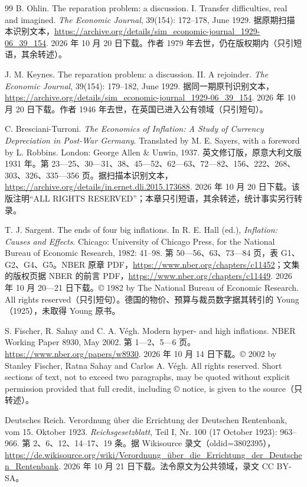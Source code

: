 \begin{thebibliography}{99}
 B. Ohlin. The reparation problem: a discussion. I. Transfer difficulties, real and imagined. \emph{The Economic Journal}, 39(154): 172--178, June 1929. 据原期扫描本识别文本，\url{https://archive.org/details/sim_economic-journal_1929-06_39_154}. 2026 年 10 月 20 日下载。作者 1979 年去世，仍在版权期内（只引短语，其余转述）。

 J. M. Keynes. The reparation problem: a discussion. II. A rejoinder. \emph{The Economic Journal}, 39(154): 179--182, June 1929. 据同一期原刊识别文本，\url{https://archive.org/details/sim_economic-journal_1929-06_39_154}. 2026 年 10 月 20 日下载。作者 1946 年去世，在英国已进入公有领域（只引短句）。

 C. Bresciani-Turroni. \emph{The Economics of Inflation: A Study of Currency Depreciation in Post-War Germany}. Translated by M. E. Sayers, with a foreword by L. Robbins. London: George Allen \& Unwin, 1937. 英文修订版，原意大利文版 1931 年。第 23—25、30—31、38、45—52、62—63、72—82、156、222、268、303、326、335—356 页。据扫描本识别文本，\url{https://archive.org/details/in.ernet.dli.2015.173688}. 2026 年 10 月 20 日下载。该版注明“ALL RIGHTS RESERVED”；本章只引短语，其余转述，统计事实另行转录。

 T. J. Sargent. The ends of four big inflations. In R. E. Hall (ed.), \emph{Inflation: Causes and Effects}. Chicago: University of Chicago Press, for the National Bureau of Economic Research, 1982: 41--98. 第 50—56、63、73—84 页，表 G1、G2、G4、G5。NBER 原章 PDF，\url{https://www.nber.org/chapters/c11452}；文集的版权页据 NBER 的前言 PDF，\url{https://www.nber.org/chapters/c11449}. 2026 年 10 月 20—21 日下载。© 1982 by The National Bureau of Economic Research. All rights reserved（只引短句）。德国的物价、预算与裁员数字据其转引的 Young（1925），未取得 Young 原书。

 S. Fischer, R. Sahay and C. A. Végh. Modern hyper- and high inflations. NBER Working Paper 8930, May 2002. 第 1—2、5—6 页。\url{https://www.nber.org/papers/w8930}. 2026 年 10 月 14 日下载。© 2002 by Stanley Fischer, Ratna Sahay and Carlos A. Végh. All rights reserved. Short sections of text, not to exceed two paragraphs, may be quoted without explicit permission provided that full credit, including © notice, is given to the source（只转述）。

 Deutsches Reich. Verordnung über die Errichtung der Deutschen Rentenbank, vom 15. Oktober 1923. \emph{Reichsgesetzblatt}, Teil I, Nr. 100 (17 October 1923): 963--966. 第 2、6、12、14--17、19 条。据 Wikisource 录文（oldid=3802395），\url{https://de.wikisource.org/wiki/Verordnung_über_die_Errichtung_der_Deutschen_Rentenbank}. 2026 年 10 月 21 日下载。法令原文为公共领域，录文 CC BY-SA。


\end{thebibliography}
